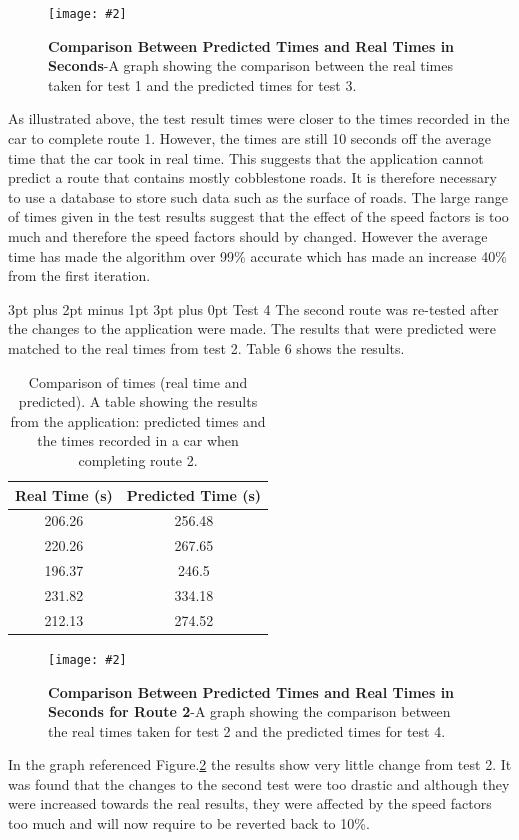 \documentclass[12pt,a4paper]{article}
\makeatletter
\newcommand{\figuremacro}[5]{
    \begin{figure}[#1]
        \centering
        \texttt{[image: \#2]}
        \caption[#3]{\textbf{#3}#4}
        \label{fig:#2}
    \end{figure}
}
\renewcommand\subsection{\@startsection {subsection}{1}{0mm} %
                               {3pt plus 2pt minus 1pt} %
                               {3pt plus 0pt} %
                               {\normalfont\bfseries}}
\makeatother
\begin{document}
\figuremacro{ht}{graph3}{Comparison Between Predicted Times and Real Times in Seconds}{-A graph showing the comparison between the real times taken for test 1 and the predicted times for test 3.}{0.8}

As illustrated above, the test result times were closer to the times recorded in the car to complete route 1. However, the times are still 10 seconds off the average time that the car took in real time. This suggests that the application cannot predict a route that contains mostly cobblestone roads. It is therefore necessary to use a database to store such data such as the surface of roads. The large range of times given in the test results suggest that the effect of the speed factors is too much and therefore the speed factors should by changed. However the average time has made the algorithm over 99\% accurate which has made an increase 40\% from the first iteration.


\subsection{Test 4}
The second route was re-tested after the changes to the application were made. The results that were predicted were matched to the real times from test 2. Table 6 shows the results.

\begin{table}[ht]
	\centering
	\caption{Comparison of times (real time and predicted). A table showing the results from the application: predicted times and the times recorded in a car when completing route 2.}
	\begin{tabular}{@{}cc@{}}
		\toprule
		Real Time (s) & Predicted Time (s) \\ \midrule
		206.26        & 256.48            \\
		220.26        & 267.65             \\
		196.37        & 246.5             \\
		231.82        & 334.18             \\
		212.13        & 274.52            \\ \bottomrule
	\end{tabular}
\end{table}

\figuremacro{h}{graph4}{Comparison Between Predicted Times and Real Times in Seconds for Route 2}{-A graph showing the comparison between the real times taken for test 2 and the predicted times for test 4.}{0.8}

In the graph referenced Figure.\ref{fig:graph4} the results show very little change from test 2. It was found that the changes to the second test were too drastic and although they were increased towards the real results, they were affected by the speed factors too much and will now require to be reverted back to 10\%.
\end{document}
